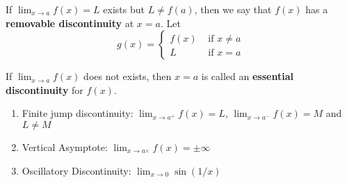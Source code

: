 \begin{defn}
If $\lim_{x\to a} f(x) = L$ exists but $L\neq f(a)$, then we say that $f(x)$ has a \textbf{removable discontinuity} at $x=a$. 
Let \[g(x) = \begin{cases} f(x) & \text{ if } x\neq a \\ L & \text{ if } x=a \end{cases}\]
\end{defn}

\begin{defn}
If $\lim_{x\to a} f(x)$ does not exists, then $x=a$ is called an \textbf{essential discontinuity} for $f(x)$.
\end{defn}

\begin{enumerate}
\item Finite jump discontinuity: $\lim_{x\to a^+} f(x) = L$, $\lim_{x\to a^-} f(x) = M$ and $L\neq M$
\item Vertical Asymptote: $\lim_{x\to a^\pm} f(x) = \pm\infty$
\item Oscillatory Discontinuity: $\lim_{x\to 0} \sin (1/x)$
\end{enumerate}
